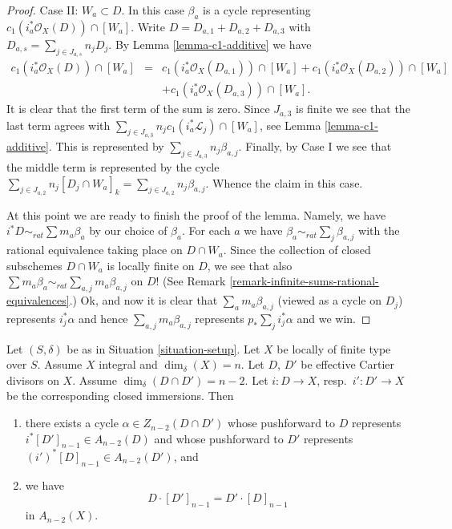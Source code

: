 \begin{proof}
\medskip\noindent
Case II: $W_a \subset D$. In this case $\beta_a$ is a cycle representing
$c_1(i_a^*\mathcal{O}_X(D)) \cap [W_a]$.
Write $D = D_{a, 1} + D_{a, 2} + D_{a, 3}$ with
$D_{a, s} = \sum_{j \in J_{a, s}} n_jD_j$.
By Lemma \ref{lemma-c1-additive} we have
\begin{eqnarray*}
c_1(i_a^*\mathcal{O}_X(D)) \cap [W_a] & = &
c_1(i_a^*\mathcal{O}_X(D_{a, 1})) \cap [W_a] +
c_1(i_a^*\mathcal{O}_X(D_{a, 2})) \cap [W_a] \\
& &
 + c_1(i_a^*\mathcal{O}_X(D_{a, 3})) \cap [W_a].
\end{eqnarray*}
It is clear that the first term of the sum is zero.
Since $J_{a, 3}$ is finite we see that the last term agrees
with $\sum\nolimits_{j \in J_{a, 3}} n_jc_1(i_a^*\mathcal{L}_j) \cap [W_a]$,
see Lemma \ref{lemma-c1-additive}.
This is represented by $\sum_{j \in J_{a, 3}} n_j \beta_{a, j}$.
Finally, by Case I we see that the middle term is represented by the cycle
$\sum\nolimits_{j \in J_{a, 2}} n_j[D_j \cap W_a]_k =
\sum_{j \in J_{a, 2}} n_j\beta_{a, j}$.
Whence the claim in this case.

\medskip\noindent
At this point we are ready to finish the proof of the lemma.
Namely, we have $i^*D \sim_{rat} \sum m_a\beta_a$ by our
choice of $\beta_a$. For each $a$ we have
$\beta_a \sim_{rat} \sum_j \beta_{a, j}$ with the rational
equivalence taking place on $D \cap W_a$.
Since the collection of closed subschemes $D \cap W_a$
is locally finite on $D$, we see that also
$\sum m_a \beta_a \sim_{rat} \sum_{a, j} m_a\beta_{a, j}$
on $D$! (See Remark \ref{remark-infinite-sums-rational-equivalences}.)
Ok, and now it is clear that $\sum_a m_a\beta_{a, j}$ (viewed
as a cycle on $D_j$) represents $i_j^*\alpha$ and hence
$\sum_{a, j} m_a\beta_{a, j}$ represents $p_* \sum_j i_j^*\alpha$
and we win.
\end{proof}

\begin{lemma}
\label{lemma-commutativity-effective-Cartier-proper-intersection}
Let $(S, \delta)$ be as in Situation \ref{situation-setup}.
Let $X$ be locally of finite type over $S$.
Assume $X$ integral and $\dim_\delta(X) = n$.
Let $D$, $D'$ be effective Cartier divisors on $X$.
Assume $\dim_\delta(D \cap D') = n - 2$. Let $i : D \to X$,
resp.\ $i' : D' \to X$ be the corresponding closed immersions.
Then
\begin{enumerate}
\item there exists a cycle $\alpha \in Z_{n - 2}(D \cap D')$
whose pushforward to $D$ represents
$i^*[D']_{n - 1} \in A_{n - 2}(D)$
and whose pushforward to $D'$ represents
$(i')^*[D]_{n - 1} \in A_{n - 2}(D')$, and
\item we have
$$
D \cdot [D']_{n - 1}
=
D' \cdot [D]_{n - 1}
$$
in $A_{n - 2}(X)$.
\end{enumerate}
\end{lemma}

